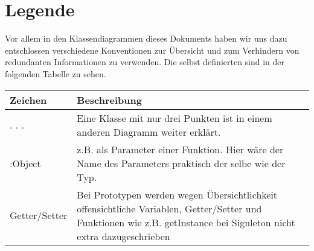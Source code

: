 \documentclass[entwurf.tex]{subfiles}
\begin{document}
\section{Legende}
Vor allem in den Klassendiagrammen dieses Dokuments haben wir uns dazu entschlossen verschiedene Konventionen zur Übersicht und zum Verhindern von redundanten Informationen zu verwenden. Die selbst definierten sind in der folgenden Tabelle zu sehen.

\begin{tabularx}{\textwidth}{ l|X }
	Zeichen	& Beschreibung\\
	\hline
	. . .	& Eine Klasse mit nur drei Punkten ist in einem anderen Diagramm weiter erklärt.\\
	:Object	& z.B. als Parameter einer Funktion. Hier wäre der Name des Parameters praktisch der selbe wie der Typ.\\
	Getter/Setter & Bei Prototypen werden wegen Übersichtlichkeit offensichtliche Variablen, Getter/Setter und Funktionen wie z.B. getInstance bei Signleton nicht extra dazugeschrieben
\end{tabularx}
\end{document}
